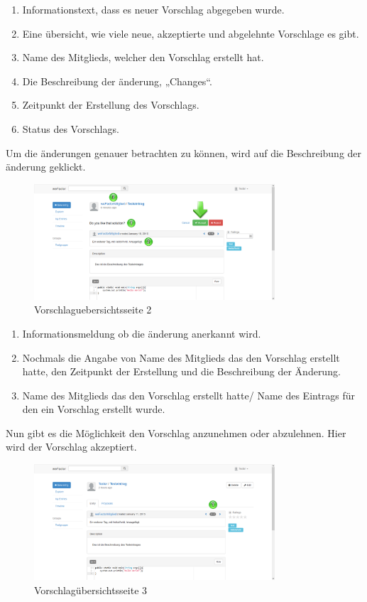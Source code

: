 \begin{enumerate}
\item Informationstext, dass es neuer Vorschlag abgegeben wurde.
\item Eine übersicht, wie viele neue, akzeptierte und abgelehnte Vorschlage es gibt.
\item Name des Mitglieds, welcher den Vorschlag erstellt hat.
\item Die Beschreibung der änderung, „Changes“.
\item Zeitpunkt der Erstellung des Vorschlags.
\item Status des Vorschlags.
\end{enumerate}



Um die änderungen genauer betrachten zu können, wird auf die Beschreibung der änderung geklickt.

\begin{figure}[H]
    \centering
    \includegraphics[width=0.8\textwidth]{Bilder/36.png}
    \caption{Vorschlaguebersichtsseite 2 }
    \label{fig:vorschlaguebersichtsseite2}
\end{figure}


\begin{enumerate}
\item Informationsmeldung ob die änderung anerkannt wird.
\item Nochmals die Angabe von Name des Mitglieds das den Vorschlag erstellt hatte, den Zeitpunkt der Erstellung und die Beschreibung der Änderung.
\item Name des Mitglieds das den Vorschlag erstellt hatte/ Name des Eintrags für den ein Vorschlag erstellt wurde.
\end{enumerate}


Nun gibt es die Möglichkeit den Vorschlag anzunehmen oder abzulehnen. Hier wird der Vorschlag akzeptiert.

\begin{figure}[H]
    \centering
    \includegraphics[width=0.8\textwidth]{Bilder/37.png}
    \caption{Vorschlagübersichtsseite 3 }
    \label{fig:vorschlaguebersichtsseite3}
\end{figure}


